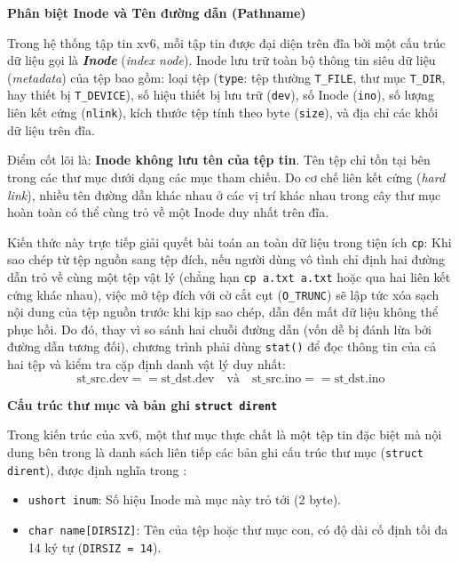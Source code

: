 \documentclass[12pt,a4paper]{article}
\begin{document}
\textbf{Phân biệt Inode và Tên đường dẫn (Pathname)}

Trong hệ thống tập tin xv6, mỗi tập tin được đại diện trên đĩa bởi một cấu trúc dữ liệu gọi là \textbf{\textit{Inode}} (\textit{index node}). Inode lưu trữ toàn bộ thông tin siêu dữ liệu (\textit{metadata}) của tệp bao gồm: loại tệp (\texttt{type}: tệp thường \texttt{T\_FILE}, thư mục \texttt{T\_DIR}, hay thiết bị \texttt{T\_DEVICE}), số hiệu thiết bị lưu trữ (\texttt{dev}), số Inode (\texttt{ino}), số lượng liên kết cứng (\texttt{nlink}), kích thước tệp tính theo byte (\texttt{size}), và địa chỉ các khối dữ liệu trên đĩa.

Điểm cốt lõi là: \textbf{Inode không lưu tên của tệp tin}. Tên tệp chỉ tồn tại bên trong các thư mục dưới dạng các mục tham chiếu. Do cơ chế liên kết cứng (\textit{hard link}), nhiều tên đường dẫn khác nhau ở các vị trí khác nhau trong cây thư mục hoàn toàn có thể cùng trỏ về một Inode duy nhất trên đĩa.

Kiến thức này trực tiếp giải quyết bài toán an toàn dữ liệu trong tiện ích \texttt{cp}: Khi sao chép từ tệp nguồn sang tệp đích, nếu người dùng vô tình chỉ định hai đường dẫn trỏ về cùng một tệp vật lý (chẳng hạn \texttt{cp a.txt a.txt} hoặc qua hai liên kết cứng khác nhau), việc mở tệp đích với cờ cắt cụt (\texttt{O\_TRUNC}) sẽ lập tức xóa sạch nội dung của tệp nguồn trước khi kịp sao chép, dẫn đến mất dữ liệu không thể phục hồi. Do đó, thay vì so sánh hai chuỗi đường dẫn (vốn dễ bị đánh lừa bởi đường dẫn tương đối), chương trình phải dùng \texttt{stat()} để đọc thông tin của cả hai tệp và kiểm tra cặp định danh vật lý duy nhất:
\[
\text{st\_src.dev} == \text{st\_dst.dev} \quad \text{và} \quad \text{st\_src.ino} == \text{st\_dst.ino}
\]

\textbf{Cấu trúc thư mục và bản ghi \texttt{struct dirent}}

Trong kiến trúc của xv6, một thư mục thực chất là một tệp tin đặc biệt mà nội dung bên trong là danh sách liên tiếp các bản ghi cấu trúc thư mục (\texttt{struct dirent}), được định nghĩa trong :
\begin{itemize}
  \item \texttt{ushort inum}: Số hiệu Inode mà mục này trỏ tới (2 byte).
  \item \texttt{char name[DIRSIZ]}: Tên của tệp hoặc thư mục con, có độ dài cố định tối đa 14 ký tự (\texttt{DIRSIZ = 14}).
\end{itemize}
\end{document}
